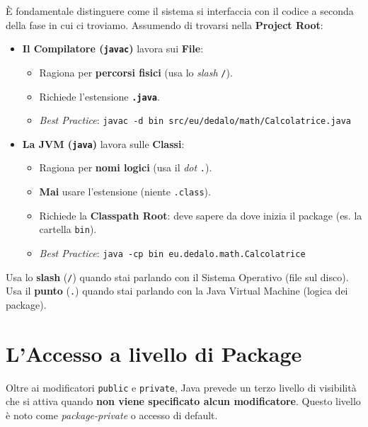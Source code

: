\begin{important}
È fondamentale distinguere come il sistema si interfaccia con il codice a seconda della fase in cui ci troviamo. Assumendo di trovarsi nella \textbf{Project Root}:

\begin{itemize}
    \item \textbf{Il Compilatore (\texttt{javac})} lavora sui \textbf{File}:
    \begin{itemize}
        \item Ragiona per \textbf{percorsi fisici} (usa lo \textit{slash} \texttt{/}).
        \item Richiede l'estensione \textbf{\texttt{.java}}.
        \item \textit{Best Practice}: \texttt{javac -d bin src/eu/dedalo/math/Calcolatrice.java}
    \end{itemize}
    
    \item \textbf{La JVM (\texttt{java})} lavora sulle \textbf{Classi}:
    \begin{itemize}
        \item Ragiona per \textbf{nomi logici} (usa il \textit{dot} \texttt{.}).
        \item \textbf{Mai} usare l'estensione (niente \texttt{.class}).
        \item Richiede la \textbf{Classpath Root}: deve sapere da dove inizia il package (es. la cartella \texttt{bin}).
        \item \textit{Best Practice}: \texttt{java -cp bin eu.dedalo.math.Calcolatrice}
    \end{itemize}
\end{itemize}
\end{important}

\begin{tip}
    Usa lo \textbf{slash} (\texttt{/}) quando stai parlando con il Sistema Operativo (file sul disco). \\
    Usa il \textbf{punto} (\texttt{.}) quando stai parlando con la Java Virtual Machine (logica dei package).
\end{tip}

\section{L'Accesso a livello di Package}

Oltre ai modificatori \texttt{public} e \texttt{private}, Java prevede un terzo livello di visibilità che si attiva quando \textbf{non viene specificato alcun modificatore}. Questo livello è noto come \textit{package-private} o accesso di default.

